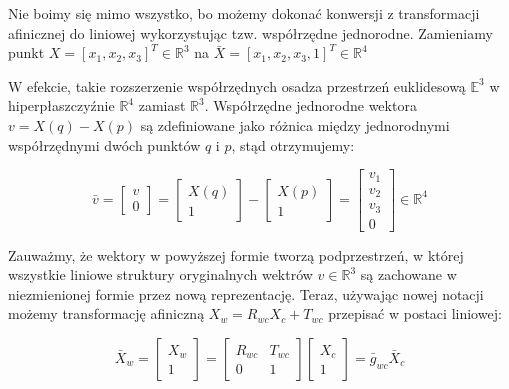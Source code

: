 \documentclass[a4paper,12pt]{article}
\newcommand{\E}{\mathbb{E}}
\newcommand{\RR}{\mathbb{R}^3}
\newcommand{\RRq}{\mathbb{R}^4}
\begin{document}
Nie boimy się mimo wszystko, bo możemy dokonać konwersji z transformacji afinicznej do liniowej wykorzystując tzw. współrzędne jednorodne. Zamieniamy punkt $X = [x_1,x_2,x_3]^T \in \RR$ na $\bar{X} = [x_1,x_2,x_3,1]^T \in \RRq$

W efekcie, takie rozszerzenie współrzędnych osadza przestrzeń euklidesową $\E^3$ w hiperpłaszczyźnie $\RRq$ zamiast $\RR$. Współrzędne jednorodne wektora $v = X(q) - X(p)$ są zdefiniowane jako różnica między jednorodnymi współrzędnymi dwóch punktów $q$ i $p$, stąd otrzymujemy:


\begin{equation}
\bar{v} = \begin{bmatrix} v \\ 0 \end{bmatrix} = \begin{bmatrix} X(q) \\ 1 \end{bmatrix} - \begin{bmatrix} X(p) \\ 1 \end{bmatrix} = \begin{bmatrix} v_1 \\ v_2 \\ v_3 \\ 0 \end{bmatrix} \in \RRq
\end{equation}


Zauważmy, że wektory w powyższej formie tworzą podprzestrzeń, w której wszystkie liniowe struktury oryginalnych wektrów $v \in \RR$ są zachowane w niezmienionej formie przez nową reprezentację. Teraz, używając nowej notacji możemy transformację afiniczną $X_w = R_{wc}X_c+ T_{wc}$ przepisać w postaci liniowej:

\begin{equation}
\bar{X}_w = \begin{bmatrix} X_w \\ 1 \end{bmatrix} = \begin{bmatrix} R_{wc} & T_{wc} \\ 0 & 1 \end{bmatrix}\begin{bmatrix} X_c \\ 1 \end{bmatrix} = \bar{g}_{wc}\bar{X}_c
\end{equation}
\end{document}
